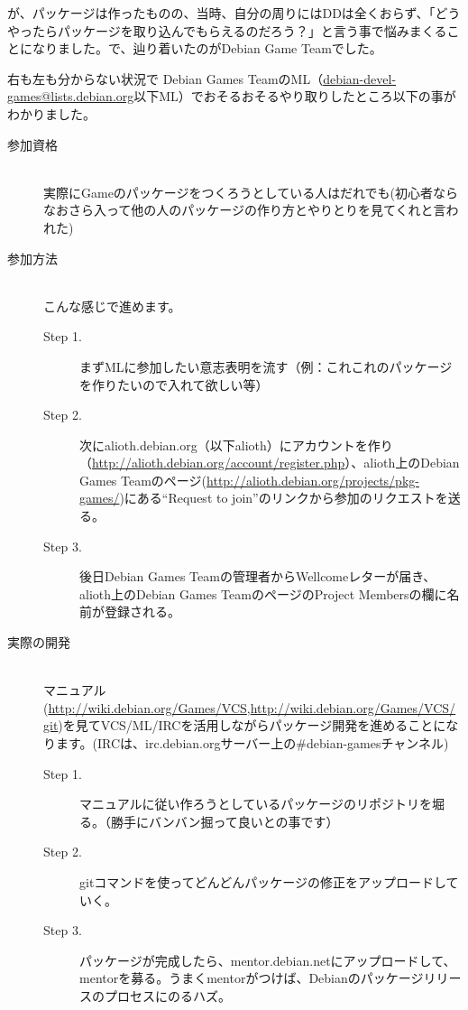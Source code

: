 \documentclass[mingoth,a4paper]{jsarticle}
\begin{document}
 が、パッケージは作ったものの、当時、自分の周りにはDDは全くおらず、「どうやったらパッケージを取り込んでもらえるのだろう？」と言う事で悩みまくることになりました。で、辿り着いたのがDebian Game Teamでした。

 右も左も分からない状況で Debian Games TeamのML（\url{debian-devel-games@lists.debian.org}以下ML）でおそるおそるやり取りしたところ以下の事がわかりました。

 \begin{description}
 \item [参加資格]\mbox{}\\
   実際にGameのパッケージをつくろうとしている人はだれでも(初心者ならなおさら入って他の人のパッケージの作り方とやりとりを見てくれと言われた)
 \item [参加方法]\mbox{}\\
   こんな感じで進めます。
   \begin{description}
   \item [Step 1.]まずMLに参加したい意志表明を流す（例：これこれのパッケージを作りたいので入れて欲しい等）
   \item [Step 2.]次にalioth.debian.org（以下alioth）にアカウントを作り（\url{http://alioth.debian.org/account/register.php}）、alioth上のDebian Games Teamのページ(\url{http://alioth.debian.org/projects/pkg-games/})にある``Request to join''のリンクから参加のリクエストを送る。
 　\item [Step 3.] 後日Debian Games Teamの管理者からWellcomeレターが届き、alioth上のDebian Games TeamのページのProject Membersの欄に名前が登録される。
   \end{description}
 \item [実際の開発]\mbox{}\\
   マニュアル(\url{http://wiki.debian.org/Games/VCS},\url{http://wiki.debian.org/Games/VCS/git})を見てVCS/ML/IRCを活用しながらパッケージ開発を進めることになります。(IRCは、irc.debian.orgサーバー上の\#debian-gamesチャンネル)
   \begin{description}
   \item [Step 1.] マニュアルに従い作ろうとしているパッケージのリポジトリを堀る。（勝手にバンバン掘って良いとの事です）
   \item [Step 2.] gitコマンドを使ってどんどんパッケージの修正をアップロードしていく。
   \item [Step 3.] パッケージが完成したら、mentor.debian.netにアップロードして、mentorを募る。うまくmentorがつけば、Debianのパッケージリリースのプロセスにのるハズ。
   \end{description}
 \end{description}
 \newpage
\end{document}
